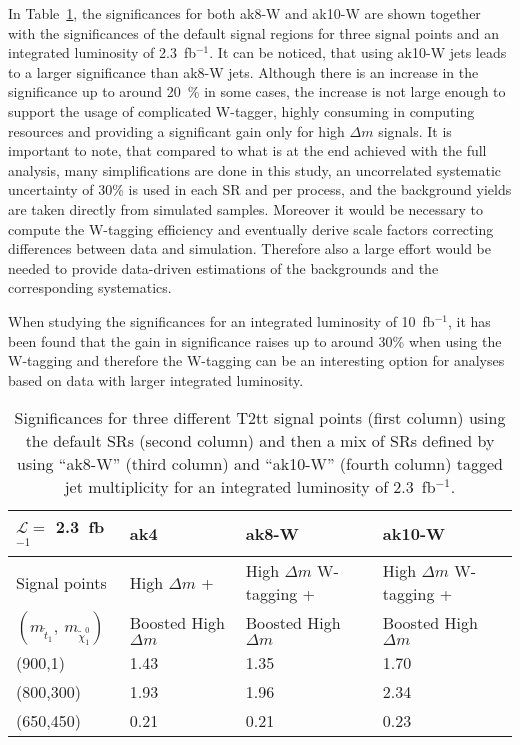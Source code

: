 In Table~\ref{tab:taggingResults}, the significances for both ak8-W and ak10-W are shown together with the significances of the default signal regions for three signal points and an integrated luminosity of 2.3~fb$^{-1}$. It can be noticed, that using ak10-W jets leads to a larger significance than ak8-W jets. Although there is an increase in the significance up to around 20~\% in some cases, the increase is not large enough to support the usage of complicated W-tagger, highly consuming in computing resources and providing a significant gain only for high $\Delta m$ signals.  It is important to note, that compared to what is at the end achieved with the full analysis, many simplifications are done in this study, an uncorrelated systematic uncertainty of 30\% is used in each SR and per process, and the background yields are taken directly from simulated samples. Moreover it would be necessary to compute the W-tagging efficiency and eventually  derive scale factors correcting differences between data and simulation.  Therefore also a large effort would be needed to provide data-driven estimations of the backgrounds and the corresponding systematics. 

When studying the significances for an integrated luminosity of  10~fb$^{-1}$,  it has been found that the gain in significance raises up to around 30\% when using the W-tagging and therefore the W-tagging can be an interesting option for analyses based on data with larger integrated luminosity. 

\begin{table}[h]
\begin{center}
\begin{tabular}{|l|l|l|l|}
\hline
$\mathcal{L} =$ 2.3~fb$^{-1}$             & ak4~\cite{Sirunyan:2017xse}      & ak8-W & ak10-W \\
\hline
Signal points                       & High $\Delta m$ +           &  High $\Delta m$ W-tagging +  &   High $\Delta m$ W-tagging +  \\
$(m_{\tilde{t}_{1}},~m_{\tilde{\chi}^{0}_{1}})$    &  Boosted High $\Delta m$    & Boosted High $\Delta m$       &   Boosted High $\Delta m$  \\
\hline
\hline
(900,1) &     1.43 & 1.35 & 1.70  \\
\hline
(800,300) &   1.93 & 1.96 & 2.34  \\
\hline
(650,450) &   0.21 & 0.21 & 0.23  \\
\hline
\end{tabular}
\caption[Table caption text]{ Significances for three different T2tt signal points (first column) using the default SRs (second column) and then a mix of SRs defined by using ``ak8-W'' (third column) and ``ak10-W'' (fourth column) tagged jet multiplicity for an integrated luminosity of 2.3~fb$^{-1}$. }
\label{tab:taggingResults}
\end{center}
\end{table}

